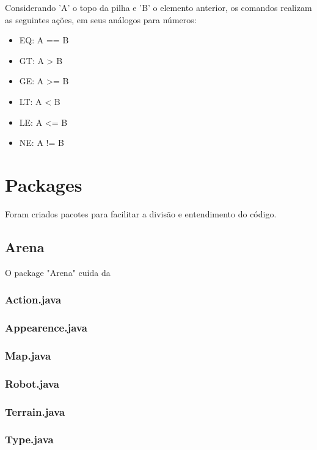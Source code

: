 \documentclass[a4paper]{article}
\begin{document}
        Considerando 'A' o topo da pilha e 'B' o elemento anterior,
        os comandos realizam as seguintes ações, em seus análogos 
        para números:
        \begin{itemize}
            \item EQ: A == B
            \item GT: A >  B
            \item GE: A >= B
            \item LT: A <  B
            \item LE: A <= B
            \item NE: A != B
        \end{itemize}
    









\newpage
\newpage

\section{Packages}
	Foram criados pacotes para facilitar a divisão
	e entendimento do código.
	
	\subsection{Arena}
		O package "Arena" cuida da 
		\subsubsection{ Action.java }
		\subsubsection{ Appearence.java }
		\subsubsection{ Map.java }
		\subsubsection{ Robot.java }
		\subsubsection{ Terrain.java }
		\subsubsection{ Type.java }
\end{document}
